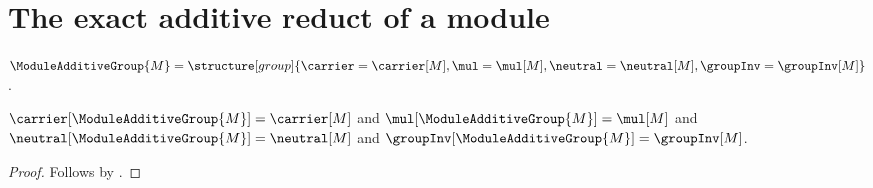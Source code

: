 

\section{The exact additive reduct of a module}

\begin{definition}\label{spike_module_additive_group}
    $\ModuleAdditiveGroup{M}=
        \structure[group]{
            \carrier=\carrier[M],
            \mul=\mul[M],
            \neutral=\neutral[M],
            \groupInv=\groupInv[M]
        }$.
\end{definition}

\begin{proposition}\label{spike_module_additive_group_fields}
    $\carrier[\ModuleAdditiveGroup{M}]=\carrier[M]$ and
    $\mul[\ModuleAdditiveGroup{M}]=\mul[M]$ and
    $\neutral[\ModuleAdditiveGroup{M}]=\neutral[M]$ and
    $\groupInv[\ModuleAdditiveGroup{M}]=\groupInv[M]$.
\end{proposition}
\begin{proof}
    Follows by
        .
\end{proof}

